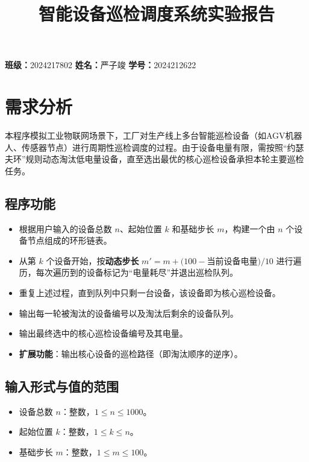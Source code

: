 \documentclass[UTF8]{ctexart}
\title{智能设备巡检调度系统实验报告}
\author{}
\begin{document}
\maketitle

\begin{center}
    \textbf{班级：}2024217802 \quad\textbf{姓名：}严子竣 \quad \textbf{学号：}2024212622
\end{center}

\section{需求分析}

本程序模拟工业物联网场景下，工厂对生产线上多台智能巡检设备（如AGV机器人、传感器节点）进行周期性巡检调度的过程。由于设备电量有限，需按照“约瑟夫环”规则动态淘汰低电量设备，直至选出最优的核心巡检设备承担本轮主要巡检任务。

\subsection{程序功能}
\begin{itemize}
    \item 根据用户输入的设备总数 \( n \)、起始位置 \( k \) 和基础步长 \( m \)，构建一个由 \( n \) 个设备节点组成的环形链表。
    \item 从第 \( k \) 个设备开始，按\textbf{动态步长} \( m' = m + (100 -\)当前设备电量\( )/10 \) 进行遍历，每次遍历到的设备标记为“电量耗尽”并退出巡检队列。
    \item 重复上述过程，直到队列中只剩一台设备，该设备即为核心巡检设备。
    \item 输出每一轮被淘汰的设备编号以及淘汰后剩余的设备队列。
    \item 输出最终选中的核心巡检设备编号及其电量。
    \item \textbf{扩展功能}：输出核心设备的巡检路径（即淘汰顺序的逆序）。
\end{itemize}

\subsection{输入形式与值的范围}
\begin{itemize}
    \item 设备总数 \( n \)：整数，\( 1 \leq n \leq 1000 \)。
    \item 起始位置 \( k \)：整数，\( 1 \leq k \leq n \)。
    \item 基础步长 \( m \)：整数，\( 1 \leq m \leq 100 \)。
\end{itemize}
\end{document}

